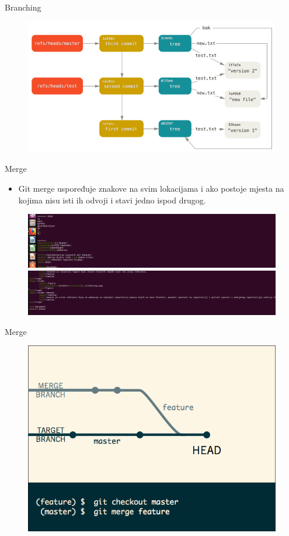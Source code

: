 \documentclass{beamer}
\begin{document}
\begin{frame}{Branching}
\begin{figure}
		\centering
	\includegraphics[width=1\textwidth]{./slike/a.png}
	\end{figure}
\end{frame}

\begin{frame}{Merge}
\begin{itemize}
	\item Git merge uspoređuje znakove na svim lokacijama i ako postoje mjesta na kojima nisu isti ih odvoji i stavi jedno ispod drugog.
\end{itemize}
	\begin{figure}
		\centering
	\includegraphics[width=.8\textwidth]{./slike/merge1.png}
	\includegraphics[width=.8\textwidth]{./slike/merge2.png}
	\end{figure}
\end{frame}

\begin{frame}{Merge}
\begin{figure}
		\centering
	\includegraphics[width=.7\textwidth]{./slike/pomoc.png}
	\end{figure}
\end{frame}
\end{document}
